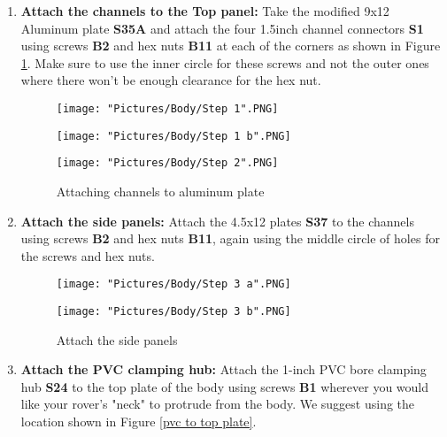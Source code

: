 \documentclass[12pt]{article}
\begin{document}
\begin{enumerate}
\item \textbf{Attach the channels to the Top panel: } Take the modified 9x12 Aluminum plate \textbf{S35A} and attach the four 1.5inch channel connectors \textbf{S1} using screws \textbf{B2} and hex nuts \textbf {B11} at each of the corners as shown in Figure \ref{channel to al plate}. Make sure to use the inner circle for these screws and not the outer ones where there won't be enough clearance for the hex nut. 

\begin{figure}[H]
  	\centering
  	\begin{minipage}[b]{0.20\textwidth}
    		\texttt{[image: "Pictures/Body/Step 1".PNG]}
  	\end{minipage}
  	\hfill
  	\begin{minipage}[b]{0.30\textwidth}
    		\texttt{[image: "Pictures/Body/Step 1 b".PNG]}
  	\end{minipage}
    	\hfill
  	\begin{minipage}[b]{0.40\textwidth}
    		\texttt{[image: "Pictures/Body/Step 2".PNG]}
  	\end{minipage}
  	\caption{Attaching channels to aluminum plate}
	\label{channel to al plate}
\end{figure}

\item \textbf{Attach the side panels: } Attach the 4.5x12 plates \textbf{S37} to the channels using screws \textbf{B2} and hex nuts \textbf{B11}, again using the middle circle of holes for the screws and hex nuts. 

\begin{figure}[H]
 	\centering
 	\begin{minipage}[b]{0.45\textwidth}
    		\texttt{[image: "Pictures/Body/Step 3 a".PNG]}
  	\end{minipage}
  	\hfill
  	\begin{minipage}[b]{0.45\textwidth}
    		\texttt{[image: "Pictures/Body/Step 3 b".PNG]}
  	\end{minipage}
  	\caption{Attach the side panels}
	\label{Body side panels}
\end{figure}

\item \textbf{Attach the PVC clamping hub:} Attach the 1-inch PVC bore clamping hub \textbf{S24} to the top plate of the body using screws \textbf{B1} wherever you would like your rover's "neck" to protrude from the body. We suggest using the location shown in Figure \ref{pvc to top plate}. 


\end{enumerate}
\end{document}
